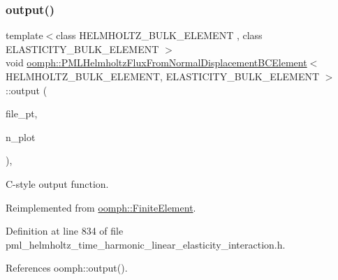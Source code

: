 \subsubsection{\texorpdfstring{output()}{output()}\hspace{0.1cm}{\footnotesize\ttfamily [4/4]}}
{\footnotesize\ttfamily template$<$class H\+E\+L\+M\+H\+O\+L\+T\+Z\+\_\+\+B\+U\+L\+K\+\_\+\+E\+L\+E\+M\+E\+NT , class E\+L\+A\+S\+T\+I\+C\+I\+T\+Y\+\_\+\+B\+U\+L\+K\+\_\+\+E\+L\+E\+M\+E\+NT $>$ \\
void \hyperlink{classoomph_1_1PMLHelmholtzFluxFromNormalDisplacementBCElement}{oomph\+::\+P\+M\+L\+Helmholtz\+Flux\+From\+Normal\+Displacement\+B\+C\+Element}$<$ H\+E\+L\+M\+H\+O\+L\+T\+Z\+\_\+\+B\+U\+L\+K\+\_\+\+E\+L\+E\+M\+E\+NT, E\+L\+A\+S\+T\+I\+C\+I\+T\+Y\+\_\+\+B\+U\+L\+K\+\_\+\+E\+L\+E\+M\+E\+NT $>$\+::output (\begin{DoxyParamCaption}\item[{F\+I\+LE $\ast$}]{file\+\_\+pt,  }\item[{const unsigned \&}]{n\+\_\+plot }\end{DoxyParamCaption})\hspace{0.3cm}{\ttfamily [inline]}, {\ttfamily [virtual]}}



C-\/style output function. 



Reimplemented from \hyperlink{classoomph_1_1FiniteElement_adfaee690bb0608f03320eeb9d110d48c}{oomph\+::\+Finite\+Element}.



Definition at line 834 of file pml\+\_\+helmholtz\+\_\+time\+\_\+harmonic\+\_\+linear\+\_\+elasticity\+\_\+interaction.\+h.



References oomph\+::output().

\mbox{\label{classoomph_1_1PMLHelmholtzFluxFromNormalDisplacementBCElement_a4e6b686d2905fc642cb735d611830be4}} 
